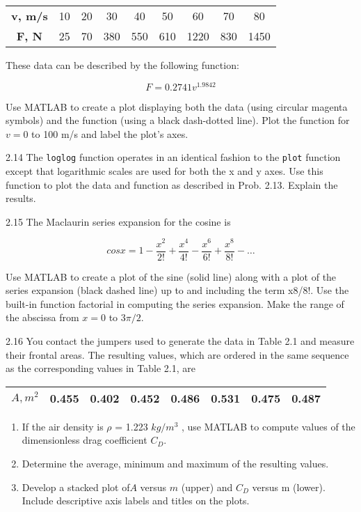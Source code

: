 \documentclass[../main.tex]{subfiles}
\begin{document}
\begin{multicols}{2}
\begin{tabular}{ccccccccc}
	\hline
	\textbf{v, m/s} &10& 20& 30 &40& 50 &60 &70 &80	\\
	\textbf{F, N} &25 &70 &380 &550 &610 &1220 &830 &1450\\
	\hline
	
\end{tabular}


These data can be described by the following function:


$$F=0.2741v^{1.9842} $$

Use MATLAB to create a plot displaying both the data (using
circular magenta symbols) and the function (using a black
dash-dotted line). Plot the function for $v = 0$ to 100 m/s and
label the plot’s axes.


2.14 The \texttt{loglog} function operates in an identical fashion
to the \texttt{plot} function except that logarithmic scales are used
for both the x and y axes. Use this function to plot the data
and function as described in Prob. 2.13. Explain the results.



2.15 The Maclaurin series expansion for the cosine is

$$cosx = 1 - \dfrac{x^2}{2!}+ \dfrac{x^4}{4!}- \dfrac{x^6}{6!}+ \dfrac{x^8}{8!}- \ldots $$


Use MATLAB to create a plot of the sine (solid line) along
with a plot of the series expansion (black dashed line) up
to and including the term x8/8!. Use the built-in function
factorial in computing the series expansion. Make the
range of the abscissa from $x = 0$ to $3\pi /2$.


2.16 You contact the jumpers used to generate the data in
Table 2.1 and measure their frontal areas. The resulting
values, which are ordered in the same sequence as the
corresponding values in Table 2.1, are

\begin{tabular}{cccccccc}
	\hline
	\textbf{$A, m^2$} &0.455 &0.402 &0.452& 0.486 &0.531 &0.475 &0.487\\
	\hline
	
\end{tabular}

\begin{enumerate}[label=(\alph*)]
	\item If the air density is $\rho$ = 1.223 $kg/m^3$
	, use MATLAB to
	compute values of the dimensionless drag coefficient $C_D$.
	\item Determine the average, minimum and maximum of the
	resulting values.
	\item Develop a stacked plot of$ A$ versus $m$ (upper) and $C_D$
	versus m (lower). Include descriptive axis labels and
	titles on the plots.
\end{enumerate}



\end{multicols}
\end{document}
